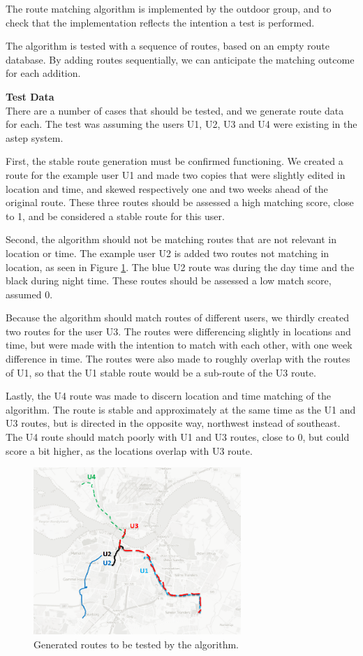 The route matching algorithm is implemented by the outdoor group, and to check that the implementation reflects the intention a test is performed.

The algorithm is tested with a sequence of routes, based on an empty route database.
By adding routes sequentially, we can anticipate the matching outcome for each addition.


\textbf{Test Data}\\
There are a number of cases that should be tested, and we generate route data for each. 
The test was assuming the users U1, U2, U3 and U4 were existing in the \gls{astep} system.

First, the stable route generation must be confirmed functioning.
We created a route for the example user U1 and made two copies that were slightly edited in location and time, and skewed respectively one and two weeks ahead of the original route.
These three routes should be assessed a high matching score, close to 1, and be considered a stable route for this user.

Second, the algorithm should not be matching routes that are not relevant in location or time.
The example user U2 is added two routes not matching in location, as seen in Figure \ref{fig:algroutes}.
The blue U2 route was during the day time and the black during night time.
These routes should be assessed a low match score, assumed 0.

Because the algorithm should match routes of different users, we thirdly created two routes for the user U3.
The routes were differencing slightly in locations and time, but were made with the intention to match with each other, with one week difference in time.
The routes were also made to roughly overlap with the routes of U1, so that the U1 stable route would be a sub-route of the U3 route.

Lastly, the U4 route was made to discern location and time matching of the algorithm.
The route is stable and approximately at the same time as the U1 and U3 routes, but is directed in the opposite way, northwest instead of southeast.
The U4 route should match poorly with U1 and U3 routes, close to 0, but could score a bit higher, as the locations overlap with U3 route.

\begin{figure}[h]
	\centering
	\includegraphics[width=0.7\textwidth]{figures/algorithmroutes.png}
	\caption{Generated routes to be tested by the algorithm.}
	\label{fig:algroutes}
\end{figure}



